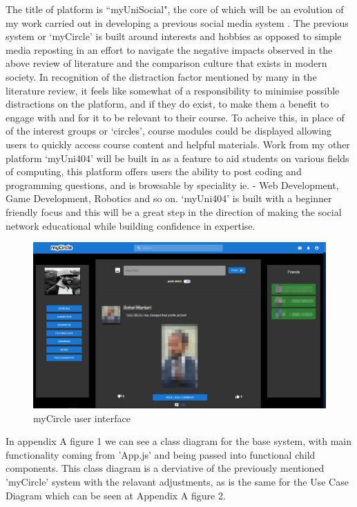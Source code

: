 \documentclass[lettersize,journal]{IEEEtran}
\begin{document}
	The title of platform is ``myUniSocial", the core of which will be an evolution of my work carried out in developing a previous social media system \cite{Daley 2022}.
	The previous system or `myCircle'\cite{myCircle} is built around interests and hobbies as opposed to simple media reposting in an
	effort to navigate the negative impacts observed in the above review of literature and the comparison culture that exists in modern
	society. In recognition of the distraction factor mentioned by many in the literature review, it feels like somewhat of a responsibility
	to minimise possible distractions on the platform, and if they do exist, to make them a benefit to engage with and for it to be relevant
	to their course. To acheive this, in place of of the interest groups or `circles', course modules could be displayed allowing users to
	quickly access course content and helpful materials. Work from my other platform `myUni404' will be built in as a feature to aid students
	on various fields of computing, this platform offers users the ability to post coding and programming questions, and is browsable by speciality
	ie. -  Web Development, Game Development, Robotics and so on. `myUni404' is built with a beginner friendly focus and this will be a great
	step in the direction of making the social network educational while building confidence in expertise.


	\begin{figure}[h!]
		\includegraphics[width=\linewidth]{myCircle.PNG}
		\caption{myCircle user interface}
		\label{figure 1}
	\end{figure}


	In appendix A figure 1 we can see a class diagram for the base system, with main functionality coming from 'App.js' and being passed into
	functional child components. This class diagram is a derviative of the previously mentioned 'myCircle' system with the relavant adjustments,
	as is the same for the Use Case Diagram which can be seen at Appendix A figure 2.
\end{document}
